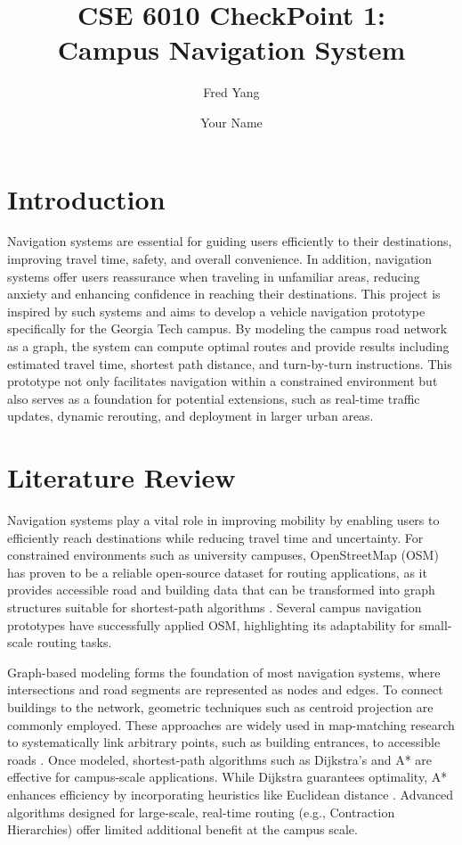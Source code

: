 \documentclass[fleqn,10pt]{olplainarticle}
\title{CSE 6010 CheckPoint 1: \\Campus Navigation System}
\author[1]{Fred Yang}
\author[2]{Your Name}
\affil[1]{fred.yang@gatech.edu}
\affil[2]{your.name@gatech.edu}
\begin{document}
\flushbottom
\maketitle
\thispagestyle{empty}

\section*{Introduction}
Navigation systems are essential for guiding users efficiently to their destinations, improving travel time, safety, and overall convenience. In addition, navigation systems offer users reassurance when traveling in unfamiliar areas, reducing anxiety and enhancing confidence in reaching their destinations. This project is inspired by such systems and aims to develop a vehicle navigation prototype specifically for the Georgia Tech campus. By modeling the campus road network as a graph, the system can compute optimal routes and provide results including estimated travel time, shortest path distance, and turn-by-turn instructions. This prototype not only facilitates navigation within a constrained environment but also serves as a foundation for potential extensions, such as real-time traffic updates, dynamic rerouting, and deployment in larger urban areas.

\section*{Literature Review}
Navigation systems play a vital role in improving mobility by enabling users to efficiently reach destinations while reducing travel time and uncertainty. For constrained environments such as university campuses, OpenStreetMap (OSM) has proven to be a reliable open-source dataset for routing applications, as it provides accessible road and building data that can be transformed into graph structures suitable for shortest-path algorithms \cite{10.1007/978-3-642-10601-9_13, s18020509}. Several campus navigation prototypes have successfully applied OSM, highlighting its adaptability for small-scale routing tasks.

Graph-based modeling forms the foundation of most navigation systems, where intersections and road segments are represented as nodes and edges. To connect buildings to the network, geometric techniques such as centroid projection are commonly employed. These approaches are widely used in map-matching research to systematically link arbitrary points, such as building entrances, to accessible roads \cite{Map-mappingResearch}. Once modeled, shortest-path algorithms such as Dijkstra’s and A* are effective for campus-scale applications. While Dijkstra guarantees optimality, A* enhances efficiency by incorporating heuristics like Euclidean distance \cite{madkour2017survey}. Advanced algorithms designed for large-scale, real-time routing (e.g., Contraction Hierarchies) offer limited additional benefit at the campus scale.
\end{document}
